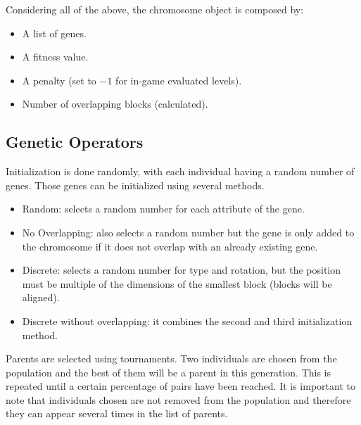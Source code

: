 Considering all of the above, the chromosome object is composed by:
\begin{itemize}
	\item A list of genes.
	\item A fitness value.
	\item A penalty (set to $-1$ for in-game evaluated levels).
	\item Number of overlapping blocks (calculated).
\end{itemize}

\subsection{Genetic Operators}

Initialization is done randomly, with each individual having a random number of genes. Those genes can be initialized using several methods. 

\begin{itemize}
	\item Random: selects a random number for each attribute of the gene.
	\item No Overlapping: also selects a random number but the gene is only added to the chromosome if it does not overlap with an already existing gene.
	\item Discrete: selects a random number for type and rotation, but the position must be multiple of the dimensions of the smallest block (blocks will be aligned).
	\item Discrete without overlapping: it combines the second and third initialization method.
\end{itemize}

Parents are selected using tournaments. Two individuals are chosen from the population and the best of them will be a parent in this generation. This is repeated until a certain percentage of pairs have been reached. It is important to note that individuals chosen are not removed from the population and therefore they can appear several times in the list of parents. 

